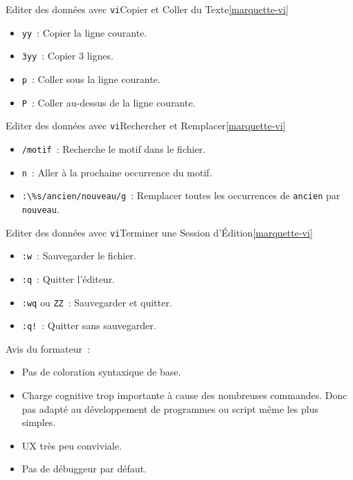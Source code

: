 \documentclass{beamer}
\begin{document}
    \begin{frame}{Editer des données avec \lstinline{vi}}{Copier et Coller du Texte\cref{marquette-vi}}
        \begin{itemize}
            \item \lstinline{yy}~: Copier la ligne courante.
            \item \lstinline{3yy}~: Copier 3 lignes.
            \item \lstinline{p}~: Coller sous la ligne courante.
            \item \lstinline{P}~: Coller au-dessus de la ligne courante.
        \end{itemize}
    \end{frame}

    \begin{frame}{Editer des données avec \lstinline{vi}}{Rechercher et Remplacer\cref{marquette-vi}}
        \begin{itemize}
            \item \lstinline{/motif}~: Recherche le motif dans le fichier.
            \item \lstinline{n}~: Aller à la prochaine occurrence du motif.
            \item \lstinline{:\%s/ancien/nouveau/g}~: Remplacer toutes les occurrences de \lstinline{ancien} par \lstinline{nouveau}.
        \end{itemize}
    \end{frame}


    \begin{frame}{Editer des données avec \lstinline{vi}}{Terminer une Session d'Édition\cref{marquette-vi}}
        \begin{itemize}
            \item \lstinline{:w}~: Sauvegarder le fichier.
            \item \lstinline{:q}~: Quitter l'éditeur.
            \item \lstinline{:wq} ou \lstinline{ZZ}~: Sauvegarder et quitter.
            \item \lstinline{:q!}~: Quitter sans sauvegarder.
        \end{itemize}

        \begin{dangercolorbox}
            Avis du formateur~:
            \begin{itemize}
                \item Pas de coloration syntaxique de base.
                \item Charge cognitive trop importante à cause des nombreuses commandes.
                Donc pas adapté au développement de programmes ou script même les plus simples.
                \item UX très peu conviviale.
                \item Pas de débuggeur par défaut.
            \end{itemize}
        \end{dangercolorbox}
    \end{frame}
\end{document}
